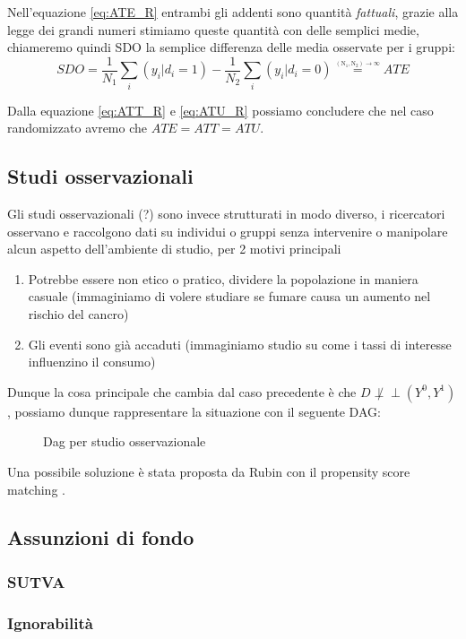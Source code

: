 \documentclass{article}
\begin{document}
Nell'equazione \ref{eq:ATE_R} entrambi gli addenti sono quantità \textit{fattuali}, grazie alla legge dei grandi numeri stimiamo queste quantità con delle semplici medie, chiameremo quindi SDO la semplice differenza delle media osservate per i gruppi:
$$SDO = \frac{1}{N_1}\sum_i(y_i|d_i=1) - \frac{1}{N_2}\sum_i(y_i|d_i=0) \overset{\underset{\mathrm{(N_1, N_2) \rightarrow \infty}}{}}{=} ATE$$

Dalla equazione \ref{eq:ATT_R} e \ref{eq:ATU_R} possiamo concludere che nel caso randomizzato avremo che $ATE = ATT = ATU$.


\subsection{Studi osservazionali}
Gli studi osservazionali (?) sono invece strutturati in modo diverso, i ricercatori osservano e raccolgono dati su individui o gruppi senza intervenire o manipolare alcun aspetto dell'ambiente di studio, per 2 motivi principali
\begin{enumerate}
\item Potrebbe essere non etico o pratico, dividere la popolazione in maniera casuale (immaginiamo di volere studiare se fumare causa un aumento nel rischio del cancro)
\item Gli eventi sono già accaduti (immaginiamo studio su come i tassi di interesse influenzino il consumo)
\end{enumerate}

Dunque la cosa principale che cambia dal caso precedente è che $D \not \perp\!\!\!\perp (Y^{0},Y^{1})$, possiamo dunque rappresentare la situazione con il seguente DAG:
\begin{figure}[!h]
\centering
\caption{Dag per studio osservazionale}
\label{fig:dag_OBS}
\end{figure}


Una possibile soluzione è stata proposta da Rubin con il propensity score matching .


\subsection{Assunzioni di fondo}
\subsubsection{SUTVA}
\subsubsection{Ignorabilità}













\nocite{*} 
\end{document}
